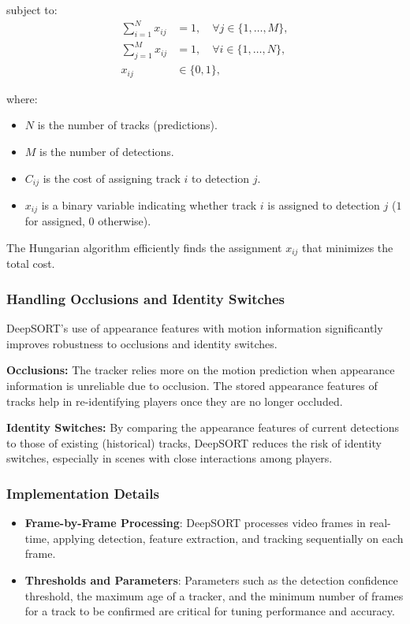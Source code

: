 \documentclass[12pt, letterpaper]{article}
\begin{document}
{\begin{spacing}{1.2}
subject to:
\begin{align*}
    \sum_{i=1}^{N} x_{ij} &= 1, \quad \forall j \in \{1, \ldots, M\}, \\
    \sum_{j=1}^{M} x_{ij} &= 1, \quad \forall i \in \{1, \ldots, N\}, \\
    x_{ij} &\in \{0, 1\},
\end{align*}

where:
\begin{itemize}
    \item \(N\) is the number of tracks (predictions).
    \item \(M\) is the number of detections.
    \item \(C_{ij}\) is the cost of assigning track \(i\) to detection \(j\).
    \item \(x_{ij}\) is a binary variable indicating whether track \(i\) is assigned to detection \(j\) (\(1\) for assigned, \(0\) otherwise).
\end{itemize}

The Hungarian algorithm efficiently finds the assignment \(x_{ij}\) that minimizes the total cost.


\subsubsection{Handling Occlusions and Identity Switches}

DeepSORT's use of appearance features with motion information significantly improves robustness to occlusions and identity switches.

\textbf{Occlusions:} The tracker relies more on the motion prediction when appearance information is unreliable due to occlusion. The stored appearance features of tracks help in re-identifying players once they are no longer occluded.

\textbf{Identity Switches:} By comparing the appearance features of current detections to those of existing (historical) tracks, DeepSORT reduces the risk of identity switches, especially in scenes with close interactions among players.


\subsubsection{Implementation Details}

\begin{itemize}
    \item \textbf{Frame-by-Frame Processing}: DeepSORT processes video frames in real-time, applying detection, feature extraction, and tracking sequentially on each frame.
    \item \textbf{Thresholds and Parameters}: Parameters such as the detection confidence threshold, the maximum age of a tracker, and the minimum number of frames for a track to be confirmed are critical for tuning performance and accuracy.
\end{itemize}


\end{spacing}
}
\end{document}
